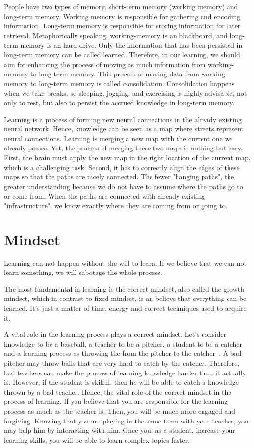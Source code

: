 \documentclass{article}
\begin{document}
People have two types of memory, short-term memory (working memory) and long-term memory. Working memory is responsible for gathering and encoding information. Long-term memory is responsible for storing information for later retrieval. Metaphorically speaking, working-memory is an blackboard, and long-term memory is an hard-drive. Only the information that has been persisted in long-term memory can be called learned. Therefore, in our learning, we should aim for enhancing the process of moving as much information from working-memory to long-term memory. This process of moving data from working memory to long-term memory is called consolidation. Consolidation happens when we take breaks, so sleeping, jogging, and exercising is highly advisable, not only to rest, but also to persist the accrued knowledge in long-term memory.

Learning is a process of forming new neural connections in the already existing neural network. Hence, knowledge can be seen as a map where streets represent neural connections. Learning is merging a new map with the current one we already posses. Yet, the process of merging these two maps is nothing but easy. First, the brain must apply the new map in the right location of the current map, which is a challenging task. Second, it has to correctly align the edges of these maps so that the paths are nicely connected. The fewer "hanging paths", the greater understanding because we do not have to assume where the paths go to or come from. When the paths are connected with already existing "infrastructure", we know exactly where they are coming from or going to. 

\section{Mindset}
Learning can not happen without the will to learn. If we believe that we can not learn something, we will sabotage the whole process.

The most fundamental in learning is the correct mindset, also called the growth mindset, which in contrast to fixed mindset, is an believe that everything can be learned. It's just a matter of time, energy and correct techniques used to acquire it. 

A vital role in the learning process plays a correct mindset. Let's consider knowledge to be a baseball, a teacher to be a pitcher, a student to be a catcher and a learning process as throwing the from the pitcher to the catcher~\cite{adler2014read}. A bad pitcher may throw balls that are very hard to catch by the catcher. Therefore, bad teachers can make the process of learning knowledge harder than it actually is. However, if the student is skilful, then he will be able to catch a knowledge thrown by a bad teacher. Hence, the vital role of the correct mindset in the process of learning. If you believe that you are responsible for the learning process as much as the teacher is. Then, you will be much more engaged and forgiving. Knowing that you are playing in the same team with your teacher, you may help him by interacting with him. Once you, as a student, increase your learning skills, you will be able to learn complex topics faster.
\end{document}
